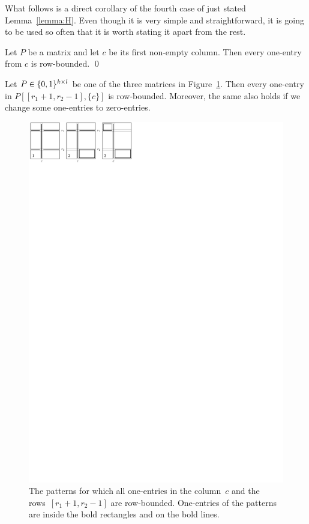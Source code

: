 What follows is a direct corollary of the fourth case of just stated Lemma~\ref{lemma:H}. Even though it is very simple and straightforward, it is going to be used so often that it is worth stating it apart from the rest.

\begin{lemma}
\label{lemma:First}
Let $P$ be a matrix and let $c$ be its first non-empty column. Then every one-entry from $c$ is row-bounded. \qed
\end{lemma}

\begin{lemma}
\label{lemma:I}
Let $P\in\{0,1\}^{k\times l}$ be one of the three matrices in Figure~\ref{fig:lemmaI}. Then every one-entry in $P[[r_1+1,r_2-1],\{c\}]$ is row-bounded. Moreover, the same also holds if we change some one-entries to zero-entries.

\begin{figure}[!ht]
\centering
\includegraphics[width=120mm]{img/lemmaI.pdf}
\caption{The patterns for which all one-entries in the column~$c$ and the rows~$[r_1+1,r_2-1]$ are row-bounded. One-entries of the patterns are inside the bold rectangles and on the bold lines.}
\label{fig:lemmaI}
\end{figure}
\end{lemma}

